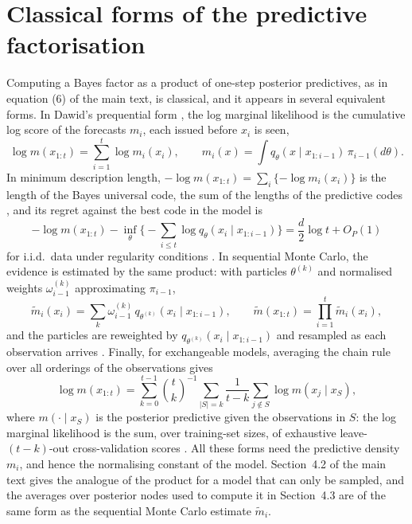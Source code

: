 \documentclass[11pt]{article}
\theoremstyle{remark}
\begin{document}
\section{Classical forms of the predictive factorisation}\label{sec:factorisation}

Computing a Bayes factor as a product of one-step posterior predictives, as in
equation (6) of the main text, is classical, and it appears in several equivalent
forms. In Dawid's prequential form \citep{dawid1984present}, the log marginal
likelihood is the cumulative log score of the forecasts $m_i$, each issued
before $x_i$ is seen,
\[
\log m(x_{1:t}) = \sum_{i=1}^{t} \log m_i(x_i),
\qquad
m_i(x) = \int q_\theta(x \mid x_{1:i-1})\,\pi_{i-1}(d\theta).
\]
In minimum description length, $-\log m(x_{1:t}) = \sum_i \{-\log m_i(x_i)\}$
is the length of the Bayes universal code, the sum of the lengths of the
predictive codes \citep{rissanen1984universal,grunwald2007minimum}, and its
regret against the best code in the model is
\[
-\log m(x_{1:t}) - \inf_\theta \Big\{-\sum_{i \le t}\log q_\theta(x_i \mid x_{1:i-1})\Big\}
= \frac d2 \log t + O_P(1)
\]
for i.i.d.\ data under regularity conditions \citep{clarke1990information}.
In sequential Monte Carlo, the evidence is estimated by the same product: with
particles $\theta^{(k)}$ and normalised weights $\omega_{i-1}^{(k)}$ approximating
$\pi_{i-1}$,
\[
\tilde m_i(x_i) = \sum_{k} \omega_{i-1}^{(k)}\, q_{\theta^{(k)}}(x_i \mid x_{1:i-1}),
\qquad
\tilde m(x_{1:t}) = \prod_{i=1}^{t} \tilde m_i(x_i),
\]
and the particles are reweighted by $q_{\theta^{(k)}}(x_i \mid x_{1:i-1})$ and
resampled as each observation arrives \citep{kong1994sequential,chopin2002sequential}.
Finally, for exchangeable models, averaging the chain rule over all orderings of
the observations gives
\[
\log m(x_{1:t}) = \sum_{k=0}^{t-1} \binom{t}{k}^{-1} \sum_{|S| = k}
\frac{1}{t-k} \sum_{j \notin S} \log m(x_j \mid x_S),
\]
where $m(\cdot \mid x_S)$ is the posterior predictive given the observations in
$S$: the log marginal likelihood is the sum, over training-set sizes, of
exhaustive leave-$(t-k)$-out cross-validation scores \citep{fong2020marginal}.
All these forms need the predictive density $m_i$, and hence the normalising
constant of the model. Section~4.2 of the main text gives the analogue of the
product for a model that can only be sampled, and the averages over posterior
nodes used to compute it in Section~4.3 are of the same form as the
sequential Monte Carlo estimate $\tilde m_i$.
\end{document}
